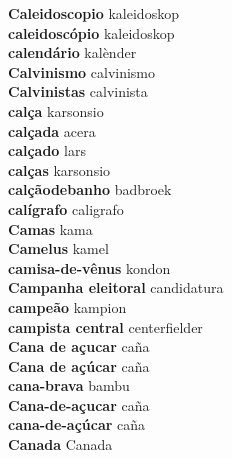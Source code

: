 \textbf{ Caleidoscopio  } kaleidoskop \\
\textbf{ caleidoscópio  } kaleidoskop \\
\textbf{ calendário  } kalènder \\
\textbf{ Calvinismo  } calvinismo \\
\textbf{ Calvinistas  } calvinista \\
\textbf{ calça  } karsonsio \\
\textbf{ calçada  } acera \\
\textbf{ calçado  } lars \\
\textbf{ calças  } karsonsio \\
\textbf{ calçãodebanho  } badbroek \\
\textbf{ calígrafo  } caligrafo \\
\textbf{ Camas  } kama \\
\textbf{ Camelus  } kamel \\
\textbf{ camisa-de-vênus  } kondon \\
\textbf{ Campanha eleitoral  } candidatura \\
\textbf{ campeão  } kampion \\
\textbf{ campista central  } centerfielder \\
\textbf{ Cana de açucar  } caña \\
\textbf{ Cana de açúcar  } caña \\
\textbf{ cana-brava  } bambu \\
\textbf{ Cana-de-açucar  } caña \\
\textbf{ cana-de-açúcar  } caña \\
\textbf{ Canada  } Canada \\
